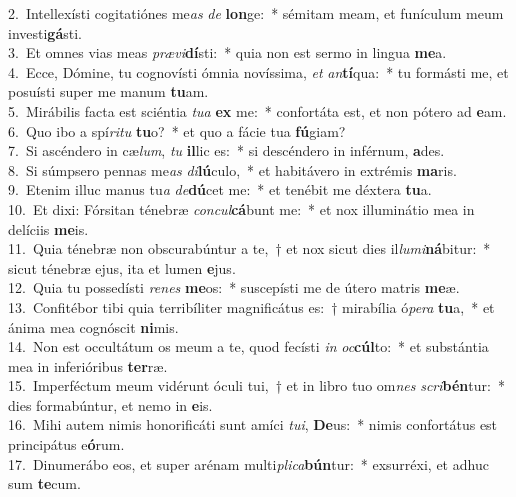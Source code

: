 {2.~}Intellexísti cogitatiónes me\textit{as} \textit{de} \textbf{lon}ge:~* sémitam meam, et funículum meum investi\textbf{gá}sti.\\
{3.~}Et omnes vias meas \textit{præ}\textit{vi}\textbf{dí}sti:~* quia non est sermo in lingua \textbf{me}a.\\
{4.~}Ecce, Dómine, tu cognovísti ómnia novíssima, \textit{et} \textit{an}\textbf{tí}qua:~* tu formásti me, et posuísti super me manum \textbf{tu}am.\\
{5.~}Mirábilis facta est sciéntia \textit{tu}\textit{a} \textbf{ex} me:~* confortáta est, et non pótero ad \textbf{e}am.\\
{6.~}Quo ibo a spí\textit{ri}\textit{tu} \textbf{tu}o?~* et quo a fácie tua \textbf{fú}giam?\\
{7.~}Si ascéndero in cæ\textit{lum}, \textit{tu} \textbf{il}lic es:~* si descéndero in inférnum, \textbf{a}des.\\
{8.~}Si súmpsero pennas me\textit{as} \textit{di}\textbf{lú}culo,~* et habitávero in extrémis \textbf{ma}ris.\\
{9.~}Etenim illuc manus tu\textit{a} \textit{de}\textbf{dú}cet me:~* et tenébit me déxtera \textbf{tu}a.\\
{10.~}Et dixi: Fórsitan ténebræ \textit{con}\textit{cul}\textbf{cá}bunt me:~* et nox illuminátio mea in delíciis \textbf{me}is.\\
{11.~}Quia ténebræ non obscurabúntur a te,~† et nox sicut dies il\textit{lu}\textit{mi}\textbf{ná}bitur:~* sicut ténebræ ejus, ita et lumen \textbf{e}jus.\\
{12.~}Quia tu possedísti \textit{re}\textit{nes} \textbf{me}os:~* suscepísti me de útero matris \textbf{me}æ.\\
{13.~}Confitébor tibi quia terribíliter magnificátus es:~† mirabília ó\textit{pe}\textit{ra} \textbf{tu}a,~* et ánima mea cognóscit \textbf{ni}mis.\\
{14.~}Non est occultátum os meum a te, quod fecísti \textit{in} \textit{oc}\textbf{cúl}to:~* et substántia mea in inferióribus \textbf{ter}ræ.\\
{15.~}Imperféctum meum vidérunt óculi tui,~† et in libro tuo om\textit{nes} \textit{scri}\textbf{bén}tur:~* dies formabúntur, et nemo in \textbf{e}is.\\
{16.~}Mihi autem nimis honorificáti sunt amíci \textit{tu}\textit{i}, \textbf{De}us:~* nimis confortátus est principátus e\textbf{ó}rum.\\
{17.~}Dinumerábo eos, et super arénam multi\textit{pli}\textit{ca}\textbf{bún}tur:~* exsurréxi, et adhuc sum \textbf{te}cum.\\
